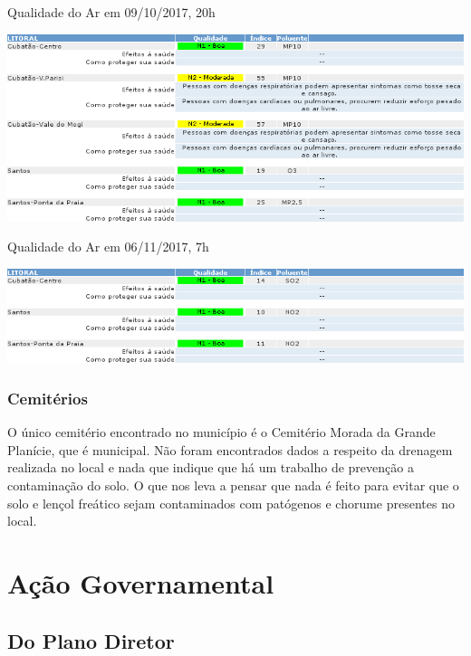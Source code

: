 	\begin{table}[!htb]
		\centering
		\caption{Qualidade do Ar em 09/10/2017, 20h}
		\includegraphics[width=1\textwidth]{img/tab_qualidade_ar.png}
		\label{tab_qualidade_ar}
	\end{table}
	
	\begin{table}[!htb]
		\centering
		\caption{Qualidade do Ar em 06/11/2017, 7h}
		\includegraphics[width=1\textwidth]{img/tab_qualidade_ar2.png}
		\label{tab_qualidade_ar2}
	\end{table}
	
	\subsection{Cemitérios}
	
	O único cemitério encontrado no município é o Cemitério Morada da Grande Planície, que é municipal. Não foram encontrados dados a respeito da drenagem realizada no local e nada que indique que há um trabalho de prevenção a contaminação do solo. O que nos leva a pensar que nada é feito para evitar que o solo e lençol freático sejam contaminados com patógenos e chorume presentes no local.
		
%
%

	\chapter{Ação Governamental}
	
	\section{Do Plano Diretor}
	
